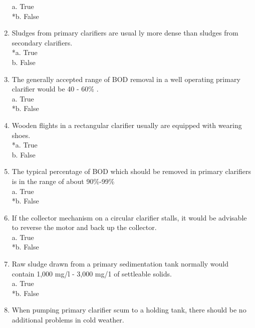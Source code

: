 \begin{enumerate}
a. True \\
*b. False \\


\item  Sludges from primary clarifiers are usual ly more dense than sludges from secondary clarifiers. \\

*a. True \\
b. False \\


\item  The generally accepted range of BOD removal in a well operating primary clarifier would be 40 - 60\% . \\

a. True \\
*b. False \\


\item  Wooden flights in a rectangular clarifier usually are equipped with wearing shoes. \\

*a. True \\
b. False \\


\item  The typical percentage of BOD which should be removed in primary clarifiers is in the range of about 90\%-99\% \\

a. True \\
*b. False \\


\item  If the collector mechanism on a circular clarifier stalls, it would be advisable to reverse the motor and back up the collector. \\

a. True \\
*b. False \\


\item  Raw sludge drawn from a primary sedimentation tank normally would contain 1,000 mg/l - 3,000 mg/1 of settleable solids. \\

a. True \\
*b. False \\


\item  When pumping primary clarifier scum to a holding tank, there should be no additional problems in cold weather. \\


\end{enumerate}
